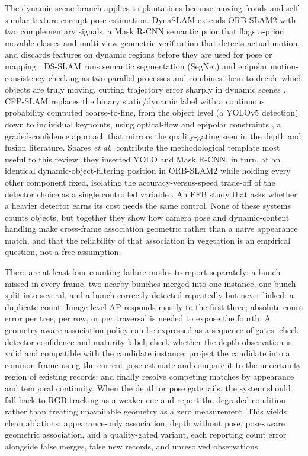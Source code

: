 The dynamic-scene branch applies to plantations because moving fronds and self-similar texture corrupt pose estimation. DynaSLAM extends ORB-SLAM2 with two complementary signals, a Mask R-CNN semantic prior that flags a-priori movable classes and multi-view geometric verification that detects actual motion, and discards features on dynamic regions before they are used for pose or mapping \cite{bescos2018dynaslam}. DS-SLAM runs semantic segmentation (SegNet) and epipolar motion-consistency checking as two parallel processes and combines them to decide which objects are truly moving, cutting trajectory error sharply in dynamic scenes \cite{yu2018dsslam}. CFP-SLAM replaces the binary static/dynamic label with a continuous probability computed coarse-to-fine, from the object level (a YOLOv5 detection) down to individual keypoints, using optical-flow and epipolar constraints \cite{hu2022cfpslam}, a graded-confidence approach that mirrors the quality-gating seen in the depth and fusion literature. Soares \textit{et al.}\ contribute the methodological template most useful to this review: they inserted YOLO and Mask R-CNN, in turn, at an identical dynamic-object-filtering position in ORB-SLAM2 while holding every other component fixed, isolating the accuracy-versus-speed trade-off of the detector choice as a single controlled variable \cite{soares2019visualslam}. An FFB study that asks whether a heavier detector earns its cost needs the same control. None of these systems counts objects, but together they show how camera pose and dynamic-content handling make cross-frame association geometric rather than a naive appearance match, and that the reliability of that association in vegetation is an empirical question, not a free assumption.

There are at least four counting failure modes to report separately: a bunch missed in every frame, two nearby bunches merged into one instance, one bunch split into several, and a bunch correctly detected repeatedly but never linked: a duplicate count. Image-level AP responds mostly to the first three; absolute count error per tree, per row, or per traversal is needed to expose the fourth. A geometry-aware association policy can be expressed as a sequence of gates: check detector confidence and maturity label; check whether the depth observation is valid and compatible with the candidate instance; project the candidate into a common frame using the current pose estimate and compare it to the uncertainty region of existing records; and finally resolve competing matches by appearance and temporal continuity. When the depth or pose gate fails, the system should fall back to RGB tracking as a weaker cue and report the degraded condition rather than treating unavailable geometry as a zero measurement. This yields clean ablations: appearance-only association, depth without pose, pose-aware geometric association, and a quality-gated variant, each reporting count error alongside false merges, false new records, and unresolved observations.



